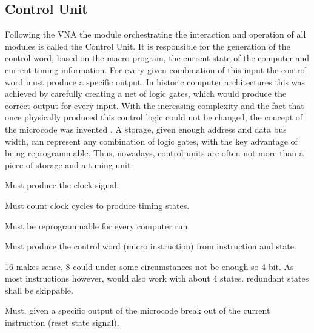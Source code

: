 \subsection{Control Unit}
Following the VNA the module orchestrating the interaction and operation of all modules is called the Control Unit. It is responsible for the generation of the control word, based on the macro program, the current state of the computer and current timing information. For every given combination of this input the control word must produce a specific output. In historic computer architectures this was achieved by carefully creating a net of logic gates, which would produce the correct output for every input. With the increasing complexity and the fact that once physically produced this control logic could not be changed, the concept of the microcode was invented \cite{cite.needed}. A storage, given enough address and data bus width, can represent any combination of logic gates, with the key advantage of being reprogrammable. Thus, nowadays, control units are often not more than a piece of storage and a timing unit. 




\begin{arch-requirement}
  Must produce the clock signal. 
\end{arch-requirement}

\begin{arch-requirement}
  Must count clock cycles to produce timing states.
\end{arch-requirement}


\begin{feat-requirement}
  Must be reprogrammable for every computer run.
\end{feat-requirement}


\begin{arch-requirement}
  Must produce the control word (micro instruction) from instruction and state.
\end{arch-requirement}




16 makes sense, 8 could under some circumstances not be enough so 4 bit.
As most instructions however, would also work with about 4 states. redundant states shall be skippable.

\begin{feat-requirement}
  Must, given a specific output of the microcode break out of the current instruction (reset state signal).
\end{feat-requirement}


